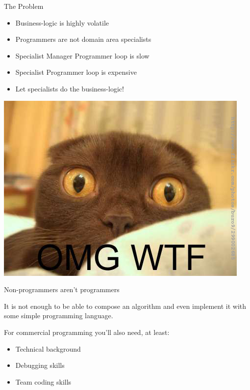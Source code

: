 \documentclass[handout]{beamer}
\begin{document}

\begin{frame}{The Problem}

\begin{itemize}
\item Business-logic is highly volatile
\item Programmers are not domain area specialists
\item Specialist \leftrightarrow Manager \leftrightarrow Programmer loop is slow
\item Specialist \leftrightarrow Programmer loop is expensive
\item Let specialists do the business-logic!
\end{itemize}

\end{frame}


\begin{frame}

\includegraphics[height=.8\textheight]{omgwtf}

\end{frame}


\begin{frame}{Non-programmers aren't programmers}

It is not enough to be able to compose an algorithm and even implement it
with some simple programming language.

For commercial programming you'll also need, at least:

\begin{itemize}
\item Technical background
\item Debugging skills
\item Team coding skills
\end{itemize}

\end{frame}
\end{document}
